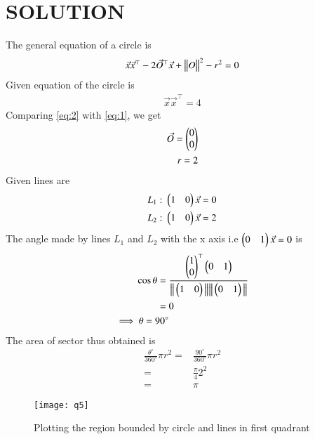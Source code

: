 \documentclass[journal,12pt,twocolumn]{IEEEtran}
\begin{document}
\section*{SOLUTION}
The general equation of a circle is 
\begin{align}
\label{eq:1}
\Vec{x}\Vec{x}^\top - 2 \Vec{O}^\top \Vec{x} + \big\lVert O\big\rVert^{2}-r^2=0
\end{align}
Given equation of the circle is
\begin{align}
\label{eq:2}
\Vec{x}\Vec{x}^\top = 4
\end{align}
Comparing \eqref{eq:2} with \eqref{eq:1}, we get
\begin{align}
\label{eq:3}
\Vec{O}=\begin{pmatrix}0 \\ 0\end{pmatrix}\\
\label{eq:4}
r=2
\end{align}
Given lines are
\begin{align}
\label{eq:5}
L_{1}: \: \begin{pmatrix}1 & 0\end{pmatrix}\Vec{x}=0 \\
\label{eq:6}
L_{2}: \: \begin{pmatrix}1 & 0\end{pmatrix}\Vec{x}=2
\end{align}
The angle made by lines $L_{1}$ and $L_{2}$ with the x axis i.e $\begin{pmatrix}0 & 1\end{pmatrix}\Vec{x}=0$ is
\begin{align}
\label{eq:7}
\cos \theta = {}&\frac{\begin{pmatrix}1 \\ 0\end{pmatrix}^\top \begin{pmatrix}0 & 1\end{pmatrix}}{\big\lVert\begin{pmatrix}1 & 0\end{pmatrix}\big\rVert\big\lVert\begin{pmatrix}0 & 1\end{pmatrix}\big\rVert}\\
\label{eq:8}
={}& 0\\
\label{eq:9}
\implies \theta = 90^{\circ}
\end{align}
The area of sector thus obtained is
\begin{align}
\label{eq;10}
\frac{\theta^{\circ}}{360^{\circ}}\pi r^2 ={}&\frac{90^{\circ}}{360^{\circ}}\pi r^2\\
\label{eq:11}
={}&\frac{\pi}{4}2^2\\
\label{eq:12}
={}&\pi
\end{align}
\begin{figure}[h]
\centering
\texttt{[image: q5]}
\caption{Plotting the region bounded by circle and lines in first quadrant}

\end{figure}
		
\end{document}
